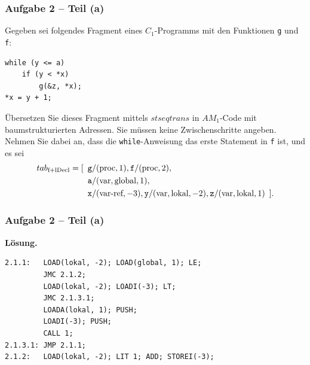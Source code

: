 \documentclass{beamer}
\begin{document}

\begin{frame}[fragile] \frametitle{Aufgabe 2 -- Teil (a)}
	\small
	Gegeben sei folgendes Fragment eines $C_1$-Programms mit den Funktionen \texttt{g} und \texttt{f}:
	\begin{lstlisting}
while (y <= a)
	if (y < *x)
		g(&z, *x);
*x = y + 1;
	\end{lstlisting}

	Übersetzen Sie dieses Fragment mittels $stseqtrans$ in $AM_1$-Code mit baumstrukturierten Adressen. Sie müssen keine Zwischenschritte angeben. Nehmen Sie dabei an, dass die \texttt{while}-Anweisung das erste Statement in \texttt{f} ist, und es sei
	\begin{align*}
		tab_{\text{f+lDecl}} = [ \enskip &\texttt{g}/(\text{proc}, 1), \texttt{f}/(\text{proc}, 2), \\
		& \texttt{a}/(\text{var}, \text{global}, 1), \\
		&\texttt{x}/\text{(var-ref}, -3), \texttt{y}/(\text{var}, \text{lokal}, -2), \texttt{z}/(\text{var}, \text{lokal}, 1) \enskip].
	\end{align*}
\end{frame}

\begin{frame}[fragile] \frametitle{Aufgabe 2 -- Teil (a)}
	
	\textbf{Lösung.}
	
	\begin{lstlisting}[numbers=none]
2.1.1:   LOAD(lokal, -2); LOAD(global, 1); LE;
         JMC 2.1.2;
         LOAD(lokal, -2); LOADI(-3); LT;
         JMC 2.1.3.1;
         LOADA(lokal, 1); PUSH; 
         LOADI(-3); PUSH; 
         CALL 1;
2.1.3.1: JMP 2.1.1;
2.1.2:   LOAD(lokal, -2); LIT 1; ADD; STOREI(-3);
	\end{lstlisting}
\end{frame}
\end{document}
